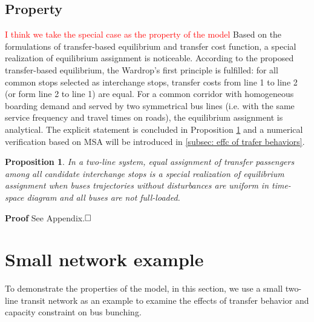 \documentclass[smallextended]{svjour3}       %
\newtheorem{mypro}[proposition]{Proposition}
\begin{document}
\begin{Abstract}
\subsection{Property}
\textcolor{red}{I think we take the special case as the property of the model}
Based on the formulations of transfer-based equilibrium and transfer cost function, a special realization of equilibrium assignment is noticeable.
According to the proposed transfer-based equilibrium, the Wardrop's first principle is fulfilled: 
for all common stops selected as interchange stops, transfer costs from line 1 to line 2 (or form line 2 to line 1) are equal.
For a common corridor with homogeneous boarding demand and served by two symmetrical bus lines (i.e. with the same service frequency and travel times on roads), the equilibrium assignment is analytical.
The explicit statement is concluded in Proposition \ref{pro:equal assignment} and a numerical verification based on MSA will be introduced in \ref{subsec: effc of trafer behaviors}. 
\begin{mypro}\label{pro:equal assignment}
    In a two-line system, equal assignment of transfer passengers among all candidate interchange stops is a special realization of equilibrium assignment when buses trajectories without disturbances are uniform in time-space diagram and all buses are not full-loaded. 
\end{mypro}
\noindent \textbf{Proof} See Appendix.$\hfill\square$ 

\section{Small network example}\label{example}
To demonstrate the properties of the model, in this section, we use a small two-line transit network as an example to examine the effects of transfer behavior and capacity constraint on bus bunching. 


\end{Abstract}
\end{document}
